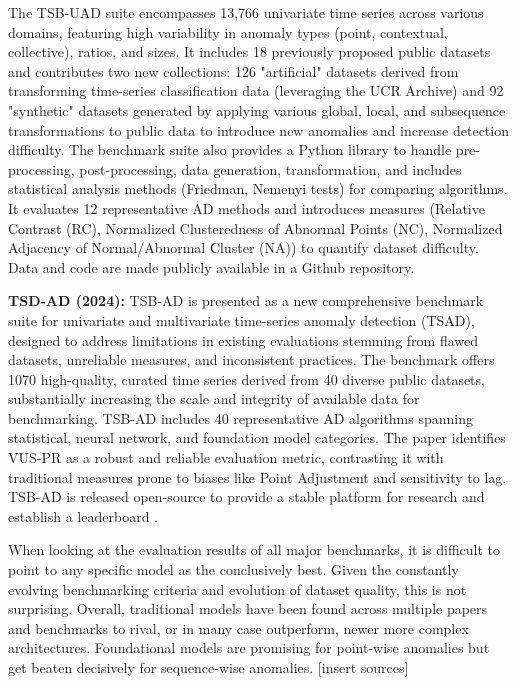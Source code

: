 \documentclass[12pt,oneside]{article}
\begin{document}
The TSB-UAD suite encompasses 13,766 univariate time series across various domains, featuring high variability in anomaly types (point, contextual, collective), ratios, and sizes. It includes 18 previously proposed public datasets and contributes two new collections: 126 "artificial" datasets derived from transforming time-series classification data (leveraging the UCR Archive) and 92 "synthetic" datasets generated by applying various global, local, and subsequence transformations to public data to introduce new anomalies and increase detection difficulty. The benchmark suite also provides a Python library to handle pre-processing, post-processing, data generation, transformation, and includes statistical analysis methods (Friedman, Nemenyi tests) for comparing algorithms. It evaluates 12 representative AD methods and introduces measures (Relative Contrast (RC), Normalized Clusteredness of Abnormal Points (NC), Normalized Adjacency of Normal/Abnormal Cluster (NA)) to quantify dataset difficulty. Data and code are made publicly available in a Github repository. \par
\textbf{TSD-AD (2024):} TSB-AD is presented as a new comprehensive benchmark suite for univariate and multivariate time-series anomaly detection (TSAD), designed to address limitations in existing evaluations stemming from flawed datasets, unreliable measures, and inconsistent practices. The benchmark offers 1070 high-quality, curated time series derived from 40 diverse public datasets, substantially increasing the scale and integrity of available data for benchmarking. TSB-AD includes 40 representative AD algorithms spanning statistical, neural network, and foundation model categories. The paper identifies VUS-PR as a robust and reliable evaluation metric, contrasting it with traditional measures prone to biases like Point Adjustment and sensitivity to lag. TSB-AD is released open-source to provide a stable platform for research and establish a leaderboard \parencites{liu2024elephant}.

When looking at the evaluation results of all major benchmarks, it is difficult to point to any specific model as the conclusively best. Given the constantly evolving benchmarking criteria and evolution of dataset quality, this is not surprising. Overall, traditional models have been found across multiple papers and benchmarks to rival, or in many case outperform, newer more complex architectures. Foundational models are promising for point-wise anomalies but get beaten decisively for sequence-wise anomalies. [insert sources]
\end{document}
